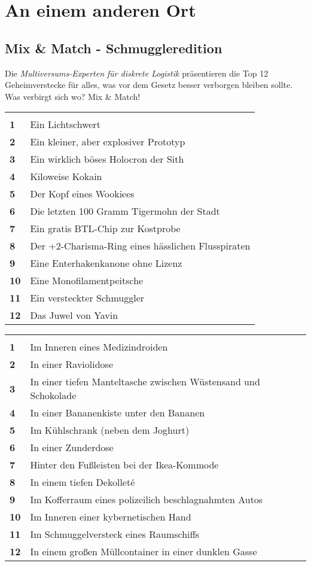 \documentclass[final]{multiversum}
\begin{document}
\section{An einem anderen Ort}
\subsection{Mix \& Match - Schmuggleredition} 
Die \textit{Multiversums-Experten für diskrete Logistik} präsentieren die Top 12 Geheimverstecke für alles, was vor dem Gesetz besser verborgen bleiben sollte. Was verbirgt sich wo? Mix \& Match!

\begin{framed}
\centering
\begin{tabular}{>{\bfseries}p{}p{}}
\multicolumn{2}{c}{\textbf{1W12}}\\
    1 & Ein Lichtschwert \\
    2 & Ein kleiner, aber explosiver Prototyp \\
    3 & Ein wirklich böses Holocron der Sith \\
    4 & Kiloweise Kokain \\
    5 & Der Kopf eines Wookiees \\
    6 & Die letzten 100 Gramm Tigermohn der Stadt \\
    7 & Ein gratis BTL-Chip zur Kostprobe \\
    8 & Der +2-Charisma-Ring eines hässlichen Flusspiraten \\
    9 & Eine Enterhakenkanone ohne Lizenz \\
    10 & Eine Monofilamentpeitsche \\
    11 & Ein versteckter Schmuggler \\
    12 & Das Juwel von Yavin \\
\end{tabular}
    \vspace{1em}

\begin{tabular}{>{\bfseries}p{}p{}}
\multicolumn{2}{c}{\textbf{1W12}}\\
    1 & Im Inneren eines Medizindroiden \\
    2 & In einer Raviolidose \\
    3 & In einer tiefen Manteltasche zwischen Wüstensand und Schokolade \\
    4 & In einer Bananenkiste unter den Bananen \\
    5 & Im Kühlschrank (neben dem Joghurt) \\
    6 & In einer Zunderdose \\
    7 & Hinter den Fußleisten bei der Ikea-Kommode \\
    8 & In einem tiefen Dekolleté \\
    9 & Im Kofferraum eines polizeilich beschlagnahmten Autos \\
    10 & Im Inneren einer kybernetischen Hand \\
    11 & Im Schmuggelversteck eines Raumschiffs \\
    12 & In einem großen Müllcontainer in einer dunklen Gasse \\
\end{tabular}
\end{framed}
\end{document}
